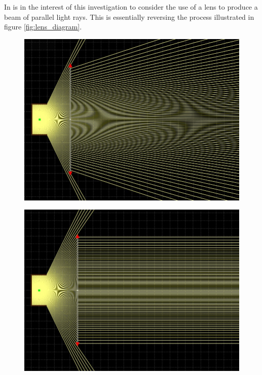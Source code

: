 In is in the interest of this investigation to consider the use of a lens to produce a beam of parallel light rays. This is essentially reversing the process illustrated in figure \ref{fig:lens_diagram}.

\begin{figure}[H]
	\centering
	\begin{minipage}{.3\textwidth}
		\centering
		\includegraphics[width=.9\linewidth]{figures/litreview/lens_divergent_beam.JPG}
		\label{fig:lens_divergent}
	\end{minipage}%
	\begin{minipage}{.3\textwidth}
		\centering
		\includegraphics[width=.9\linewidth]{figures/litreview/lens_parallel_beam.JPG}
		\label{fig:lens_parallel}
	\end{minipage}
	\begin{minipage}{.3\textwidth}

\end{minipage}
\end{figure}
